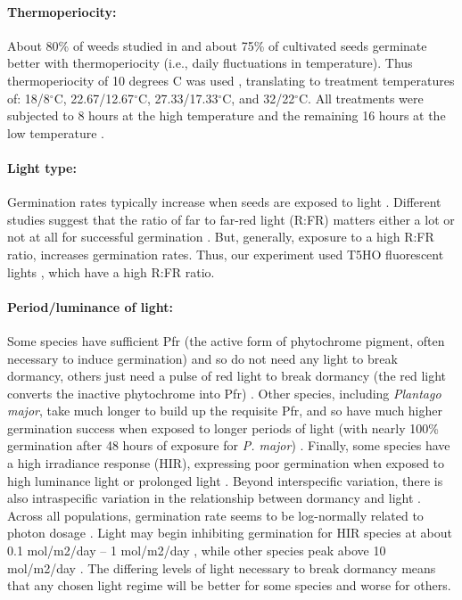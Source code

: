 \documentclass[12pt]{article}\usepackage[]{graphicx}\usepackage[]{color}
\begin{document}
	\paragraph{Thermoperiocity:} About 80\% of weeds studied in \textcite{Steinbauer1957} and about 75\% of cultivated seeds germinate better with thermoperiocity (i.e., daily fluctuations in temperature)\parencite{Toole1963,ISTA1954}. Thus thermoperiocity of 10 degrees C was used \parencite[see e.g.,][]{Steinbauer1957}, translating to treatment temperatures of: 18/8$^\circ$C, 22.67/12.67$^\circ$C, 27.33/17.33$^\circ$C, and 32/22$^\circ$C. All treatments were subjected to 8 hours at the high temperature and the remaining 16 hours at the low temperature \parencite{Baskin1998,Roberts1981,Popay1970,Probert2000}.
	
	
	\paragraph{Light type:} Germination rates typically increase when seeds are exposed to light \parencite[e.g.,][]{Baskin1998,Pons2000,Popay1970}. Different studies suggest that the ratio of far to far-red light (R:FR) matters either a lot or not at all for successful germination \parencite[e.g.,][]{Popay1970,Pons2000,Wulff1994}. But, generally, exposure to a high R:FR ratio, increases germination rates. Thus, our experiment used T5HO fluorescent lights \parencite{Toole1963}, which have a high R:FR ratio. 
	
	\paragraph{Period/luminance of light:} Some species have sufficient Pfr (the active form of phytochrome pigment, often necessary to induce germination) and so do not need any light to break dormancy, others just need a pulse of red light to break dormancy (the red light converts the inactive phytochrome into Pfr) \parencite{Casal998}.  Other species, including \textit{Plantago major}, take much longer to build up the requisite Pfr, and so have much higher germination success when exposed to longer periods of light (with nearly 100\% germination after 48 hours of exposure for \textit{P. major}) \parencite{Pons1991}. Finally, some species have a high irradiance response (HIR), expressing poor germination when exposed to high luminance light or prolonged light \parencite{Roberts1987}. Beyond interspecific variation, there is also intraspecific variation in the relationship between dormancy and light \parencite{Probert1986}. Across all populations, germination rate seems to be log-normally related to photon dosage \parencite{Ellis1986}. Light may begin inhibiting germination for HIR species at about 0.1 mol/m2/day – 1 mol/m2/day \parencite{Baskin1998,Ellis1986}, while other species peak above 10 mol/m2/day \parencite{Ellis1986}. The differing levels of light necessary to break dormancy means that any chosen light regime will be better for some species and worse for others. 
	
\end{document}
